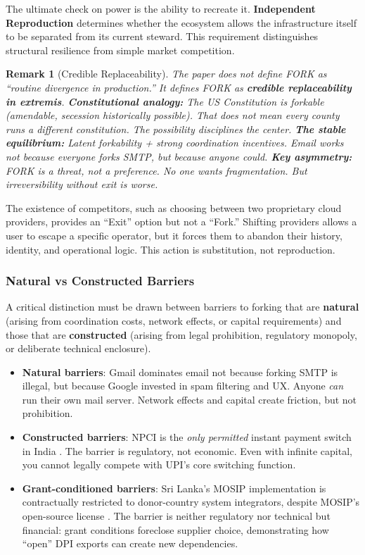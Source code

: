 \documentclass{article}
\newtheorem{remark}{Remark}[section]
\begin{document}
The ultimate check on power is the ability to recreate it. \textbf{Independent Reproduction} determines whether the ecosystem allows the infrastructure itself to be separated from its current steward. This requirement distinguishes structural resilience from simple market competition.

\begin{remark}[Credible Replaceability]
The paper does not define FORK as ``routine divergence in production.'' It defines FORK as \textbf{credible replaceability in extremis}. \textbf{Constitutional analogy:} The US Constitution is forkable (amendable, secession historically possible). That does not mean every county runs a different constitution. The \textit{possibility} disciplines the center. \textbf{The stable equilibrium:} Latent forkability + strong coordination incentives. Email works not because everyone forks SMTP, but because anyone \textit{could}. \textbf{Key asymmetry:} FORK is a threat, not a preference. No one wants fragmentation. But irreversibility without exit is worse.
\end{remark}

The existence of competitors, such as choosing between two proprietary cloud providers, provides an ``Exit'' option but not a ``Fork.'' Shifting providers allows a user to escape a specific operator, but it forces them to abandon their history, identity, and operational logic. This action is substitution, not reproduction.

\subsubsection{Natural vs Constructed Barriers}

A critical distinction must be drawn between barriers to forking that are \textbf{natural} (arising from coordination costs, network effects, or capital requirements) and those that are \textbf{constructed} (arising from legal prohibition, regulatory monopoly, or deliberate technical enclosure).

\begin{itemize}
    \item \textbf{Natural barriers}: Gmail dominates email not because forking SMTP is illegal, but because Google invested in spam filtering and UX. Anyone \textit{can} run their own mail server. Network effects and capital create friction, but not prohibition.
    \item \textbf{Constructed barriers}: NPCI is the \textit{only permitted} instant payment switch in India \citep{rbipso2026}. The barrier is regulatory, not economic. Even with infinite capital, you cannot legally compete with UPI's core switching function.
    \item \textbf{Grant-conditioned barriers}: Sri Lanka's MOSIP implementation is contractually restricted to donor-country system integrators, despite MOSIP's open-source license \citep{biometricupdate2025}. The barrier is neither regulatory nor technical but financial: grant conditions foreclose supplier choice, demonstrating how ``open'' DPI exports can create new dependencies.
\end{itemize}
\end{document}
